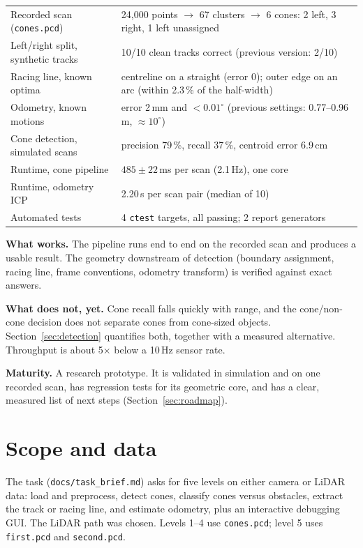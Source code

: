 \documentclass[10pt,a4paper]{scrartcl}
\newcommand{\code}[1]{\texttt{#1}}
\newcommand{\file}[1]{\texttt{\small #1}}
\newcommand{\RuleSection}[1]{%
    \section{#1}%
    \vspace{0.2em}{\color{accent!35}\hrule height 0.4pt}\vspace{0.3em}%
  }
\begin{document}
  \begin{keybox}
  \small
  \begin{tabularx}{\linewidth}{@{}L{6.2cm} X@{}}
  Recorded scan (\code{cones.pcd}) & 24,000 points $\to$ 67 clusters $\to$ 6 cones: 2 left, 3 right, 1 left unassigned \\
  Left/right split, synthetic tracks & 10/10 clean tracks correct (previous version: 2/10) \\
  Racing line, known optima & centreline on a straight (error 0); outer edge on an arc (within 2.3\,\% of the half-width) \\
  Odometry, known motions & error 2\,mm and $<0.01^\circ$ (previous settings: 0.77--0.96\,m, $\approx10^\circ$) \\
  Cone detection, simulated scans & precision 79\,\%, recall 37\,\%, centroid error 6.9\,cm \\
  Runtime, cone pipeline & $485\pm22$\,ms per scan (2.1\,Hz), one core \\
  Runtime, odometry ICP & 2.20\,s per scan pair (median of 10) \\
  Automated tests & 4 \code{ctest} targets, all passing; 2 report generators \\
  \end{tabularx}
  \end{keybox}

  \textbf{What works.} The pipeline runs end to end on the recorded scan and produces a
  usable result. The geometry downstream of detection (boundary assignment, racing line,
  frame conventions, odometry transform) is verified against exact answers.

  \textbf{What does not, yet.} Cone recall falls quickly with range, and the cone/non-cone
  decision does not separate cones from cone-sized objects. Section~\ref{sec:detection}
  quantifies both, together with a measured alternative. Throughput is about 5$\times$ below a
  10\,Hz sensor rate.

  \textbf{Maturity.} A research prototype. It is validated in simulation and on one recorded
  scan, has regression tests for its geometric core, and has a clear, measured list of next
  steps (Section~\ref{sec:roadmap}).

  \RuleSection{Scope and data}
  \label{sec:scope}

  The task (\file{docs/task\_brief.md}) asks for five levels on either camera or LiDAR data:
  load and preprocess, detect cones, classify cones versus obstacles, extract the track or
  racing line, and estimate odometry, plus an interactive debugging GUI. The LiDAR path was
  chosen. Levels 1--4 use \code{cones.pcd}; level 5 uses \code{first.pcd} and \code{second.pcd}.
\end{document}

